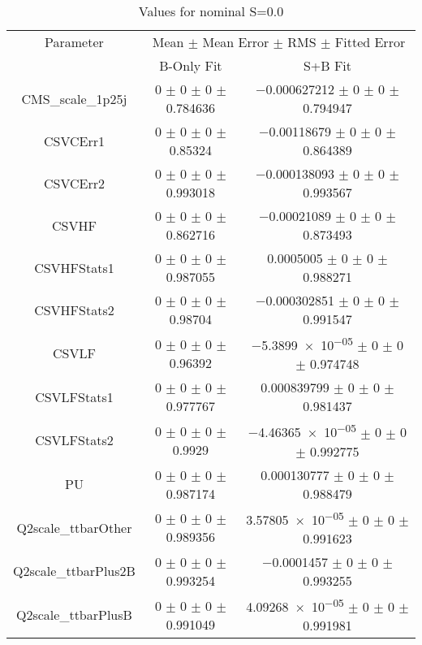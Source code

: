 \begin{table}
\centering
\caption{Values for nominal S=0.0}
\begin{tabular}{ccc}
\toprule
Parameter & \multicolumn{2}{c}{Mean $\pm$ Mean Error $\pm$ RMS $\pm$ Fitted Error}\\
 & B-Only Fit & S+B Fit\\
\midrule
CMS\_scale\_1p25j & \num{0} $\pm$ \num{0} $\pm$ \num{0} $\pm$ \num{0.784636} & \num{-0.000627212} $\pm$ \num{0} $\pm$ \num{0} $\pm$ \num{0.794947}\\
CSVCErr1 & \num{0} $\pm$ \num{0} $\pm$ \num{0} $\pm$ \num{0.85324} & \num{-0.00118679} $\pm$ \num{0} $\pm$ \num{0} $\pm$ \num{0.864389}\\
CSVCErr2 & \num{0} $\pm$ \num{0} $\pm$ \num{0} $\pm$ \num{0.993018} & \num{-0.000138093} $\pm$ \num{0} $\pm$ \num{0} $\pm$ \num{0.993567}\\
CSVHF & \num{0} $\pm$ \num{0} $\pm$ \num{0} $\pm$ \num{0.862716} & \num{-0.00021089} $\pm$ \num{0} $\pm$ \num{0} $\pm$ \num{0.873493}\\
CSVHFStats1 & \num{0} $\pm$ \num{0} $\pm$ \num{0} $\pm$ \num{0.987055} & \num{0.0005005} $\pm$ \num{0} $\pm$ \num{0} $\pm$ \num{0.988271}\\
CSVHFStats2 & \num{0} $\pm$ \num{0} $\pm$ \num{0} $\pm$ \num{0.98704} & \num{-0.000302851} $\pm$ \num{0} $\pm$ \num{0} $\pm$ \num{0.991547}\\
CSVLF & \num{0} $\pm$ \num{0} $\pm$ \num{0} $\pm$ \num{0.96392} & \num{-5.3899e-05} $\pm$ \num{0} $\pm$ \num{0} $\pm$ \num{0.974748}\\
CSVLFStats1 & \num{0} $\pm$ \num{0} $\pm$ \num{0} $\pm$ \num{0.977767} & \num{0.000839799} $\pm$ \num{0} $\pm$ \num{0} $\pm$ \num{0.981437}\\
CSVLFStats2 & \num{0} $\pm$ \num{0} $\pm$ \num{0} $\pm$ \num{0.9929} & \num{-4.46365e-05} $\pm$ \num{0} $\pm$ \num{0} $\pm$ \num{0.992775}\\
PU & \num{0} $\pm$ \num{0} $\pm$ \num{0} $\pm$ \num{0.987174} & \num{0.000130777} $\pm$ \num{0} $\pm$ \num{0} $\pm$ \num{0.988479}\\
Q2scale\_ttbarOther & \num{0} $\pm$ \num{0} $\pm$ \num{0} $\pm$ \num{0.989356} & \num{3.57805e-05} $\pm$ \num{0} $\pm$ \num{0} $\pm$ \num{0.991623}\\
Q2scale\_ttbarPlus2B & \num{0} $\pm$ \num{0} $\pm$ \num{0} $\pm$ \num{0.993254} & \num{-0.0001457} $\pm$ \num{0} $\pm$ \num{0} $\pm$ \num{0.993255}\\
Q2scale\_ttbarPlusB & \num{0} $\pm$ \num{0} $\pm$ \num{0} $\pm$ \num{0.991049} & \num{4.09268e-05} $\pm$ \num{0} $\pm$ \num{0} $\pm$ \num{0.991981}\\

\end{tabular}
\end{table}
